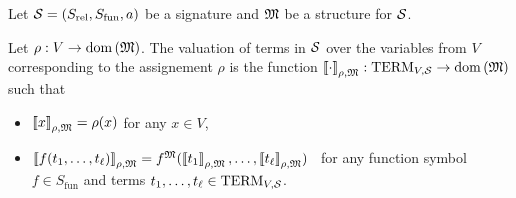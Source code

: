 \begin{definition}
  Let $\mathcal{S} = (S_\mathrm{rel}, S_\mathrm{fun}, a)$ be a signature and
  $\mathfrak{M}$ be a structure for $\mathcal{S}$.

  Let $\rho : V \to \mathrm{dom}\left({\mathfrak{M}}\right)$.
  The valuation of terms in $\mathcal{S}$ over the variables from $V$
  corresponding to the assignement $\rho$ is the function 
  $\left\llbracket {\cdot} \right\rrbracket_{\rho, \mathfrak{M}} : 
    \mathrm{TERM}_{{V}, {\mathcal{S}}} \to \mathrm{dom}\left({\mathfrak{M}}\right)$ such that
  \begin{itemize}
    \item $\left\llbracket {x} \right\rrbracket_{\rho, \mathfrak{M}} = \rho(x)$ for any $x \in V$,
    \item $\left\llbracket {f(t_1, \dots, t_\ell)} \right\rrbracket_{\rho, \mathfrak{M}} = 
      f^{\mathfrak{M}}(
        \left\llbracket {t_1} \right\rrbracket_{\rho, \mathfrak{M}},
        \dots,
        \left\llbracket {t_\ell} \right\rrbracket_{\rho, \mathfrak{M}}
      )$ \,
      for any function symbol $f \in S_\mathrm{fun}$ and 
      terms $t_1, \dots, t_\ell \in \mathrm{TERM}_{{V}, {\mathcal{S}}}$.
  \end{itemize}


\end{definition}
